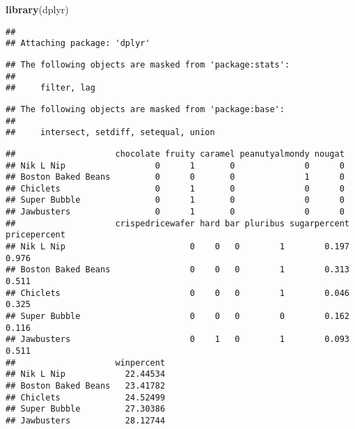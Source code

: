 \documentclass[
]{article}
\newenvironment{Shaded}{\begin{snugshade}}{\end{snugshade}}
\newcommand{\DecValTok}[1]{\textcolor[rgb]{0.00,0.00,0.81}{#1}}
\newcommand{\KeywordTok}[1]{\textcolor[rgb]{0.13,0.29,0.53}{\textbf{#1}}}
\newcommand{\NormalTok}[1]{#1}
\newcommand{\OperatorTok}[1]{\textcolor[rgb]{0.81,0.36,0.00}{\textbf{#1}}}
\newcommand{\StringTok}[1]{\textcolor[rgb]{0.31,0.60,0.02}{#1}}
\begin{document}
\begin{Shaded}
\begin{Highlighting}[]
\KeywordTok{library}\NormalTok{(dplyr)}
\end{Highlighting}
\end{Shaded}

\begin{verbatim}
## 
## Attaching package: 'dplyr'
\end{verbatim}

\begin{verbatim}
## The following objects are masked from 'package:stats':
## 
##     filter, lag
\end{verbatim}

\begin{verbatim}
## The following objects are masked from 'package:base':
## 
##     intersect, setdiff, setequal, union
\end{verbatim}

\begin{Shaded}
\end{Shaded}

\begin{verbatim}
##                    chocolate fruity caramel peanutyalmondy nougat
## Nik L Nip                  0      1       0              0      0
## Boston Baked Beans         0      0       0              1      0
## Chiclets                   0      1       0              0      0
## Super Bubble               0      1       0              0      0
## Jawbusters                 0      1       0              0      0
##                    crispedricewafer hard bar pluribus sugarpercent pricepercent
## Nik L Nip                         0    0   0        1        0.197        0.976
## Boston Baked Beans                0    0   0        1        0.313        0.511
## Chiclets                          0    0   0        1        0.046        0.325
## Super Bubble                      0    0   0        0        0.162        0.116
## Jawbusters                        0    1   0        1        0.093        0.511
##                    winpercent
## Nik L Nip            22.44534
## Boston Baked Beans   23.41782
## Chiclets             24.52499
## Super Bubble         27.30386
## Jawbusters           28.12744
\end{verbatim}
\end{document}
